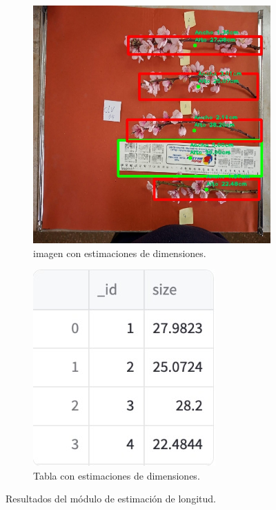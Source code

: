 \begin{figure}[ht]
     \centering
     \begin{subfigure}[b]{0.3\textwidth}
         \centering
         \includegraphics[scale=0.4]{./Figures/vareta_size.jpeg}
         \caption{imagen con estimaciones de dimensiones.}
         \label{fig:1de33}
     \end{subfigure}
     \hfill
     \begin{subfigure}[b]{0.3\textwidth}
         \centering
         \includegraphics[scale=.4]{./Figures/vareta_size_table.jpg}
         \caption{Tabla con estimaciones de dimensiones.}
         \label{fig:2de33}
     \end{subfigure}
        \caption{Resultados del módulo de estimación de longitud.}
        \label{fig:modulo1}
\end{figure}
\newpage


